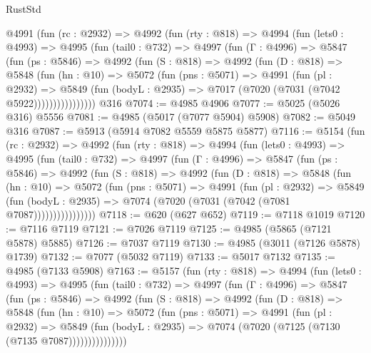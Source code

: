 \begin{lexlean}{RustStd}
\begin{coremodule}
    @4991
      (fun (rc : @2932) =>
      @4992
        (fun (rty : @818) =>
        @4994
          (fun (lets0 : @4993) =>
          @4995
            (fun (tail0 : @732) =>
            @4997
              (fun (Γ : @4996) =>
              @5847
                (fun (ps : @5846) =>
                @4992
                  (fun (S : @818) =>
                  @4992
                    (fun (D : @818) =>
                    @5848
                      (fun (hn : @10) =>
                      @5072
                        (fun (pns : @5071) =>
                        @4991
                          (fun (pl : @2932) =>
                          @5849
                            (fun (bodyL : @2935) => @7017 (@7020 (@7031 (@7042 @5922))))))))))))))))
    @316
@7074 := @4985 @4906
@7077 := @5025 (@5026 @316) @5556
@7081 := @4985 (@5017 (@7077 @5904) @5908)
@7082 := @5049 @316
@7087 := @5913 (@5914 @7082 @5559 @5875 @5877)
@7116 := @5154
    (fun (rc : @2932) =>
    @4992
      (fun (rty : @818) =>
      @4994
        (fun (lets0 : @4993) =>
        @4995
          (fun (tail0 : @732) =>
          @4997
            (fun (Γ : @4996) =>
            @5847
              (fun (ps : @5846) =>
              @4992
                (fun (S : @818) =>
                @4992
                  (fun (D : @818) =>
                  @5848
                    (fun (hn : @10) =>
                    @5072
                      (fun (pns : @5071) =>
                      @4991
                        (fun (pl : @2932) =>
                        @5849
                          (fun (bodyL : @2935) =>
                          @7074 (@7020 (@7031 (@7042 (@7081 @7087))))))))))))))))
@7118 := @620 (@627 @652)
@7119 := @7118 @1019
@7120 := @7116 @7119
@7121 := @7026 @7119
@7125 := @4985 (@5865 (@7121 @5878) @5885)
@7126 := @7037 @7119
@7130 := @4985 (@3011 (@7126 @5878) @1739)
@7132 := @7077 (@5032 @7119)
@7133 := @5017 @7132
@7135 := @4985 (@7133 @5908)
@7163 := @5157
    (fun (rty : @818) =>
    @4994
      (fun (lets0 : @4993) =>
      @4995
        (fun (tail0 : @732) =>
        @4997
          (fun (Γ : @4996) =>
          @5847
            (fun (ps : @5846) =>
            @4992
              (fun (S : @818) =>
              @4992
                (fun (D : @818) =>
                @5848
                  (fun (hn : @10) =>
                  @5072
                    (fun (pns : @5071) =>
                    @4991
                      (fun (pl : @2932) =>
                      @5849
                        (fun (bodyL : @2935) =>
                        @7074 (@7020 (@7125 (@7130 (@7135 @7087)))))))))))))))

\end{coremodule}
\end{lexlean}
